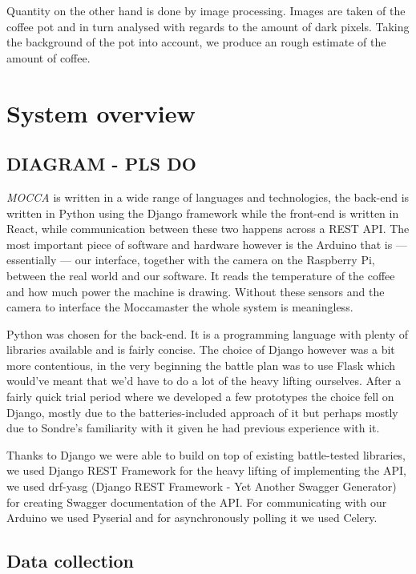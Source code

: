 \documentclass[12pt,a4paper,oneside,article]{memoir}
\numberwithin{equation}{chapter}
\begin{document}
Quantity on the other hand is done by image processing. Images are taken of the 
coffee pot and in turn analysed with regards to the amount of dark pixels. 
Taking the background of the pot into account, we produce an rough estimate of 
the amount of coffee. 


\section{System overview}\label{sec:technical-details}

\subsection{DIAGRAM - PLS DO}
\textit{MOCCA} is written in a wide range of languages and technologies, the
back-end is written in Python using the Django framework while the front-end is
written in React, while communication between these two happens across a REST
API.
The most important piece of software and hardware however is the Arduino
that is --- essentially --- our interface, together with the camera on the 
Raspberry Pi, between the real world and our software. It reads the temperature 
of the coffee and how much power the machine is drawing. Without these sensors 
and the camera to interface the Moccamaster the whole system is meaningless. 

Python was chosen for the back-end. It is a programming language with plenty of 
libraries available and is fairly concise. The choice of Django however was a 
bit more contentious, in the very beginning the battle plan was to use Flask 
which would've meant that we'd have to do a lot of the heavy lifting ourselves.
After a fairly quick trial period where we developed a few prototypes the choice
fell on Django, mostly due to the batteries-included approach of it but perhaps
mostly due to Sondre's familiarity with it given he had previous experience with
it.

Thanks to Django we were able to build on top of existing battle-tested
libraries, we used Django REST Framework for the heavy lifting of implementing
the API, we used drf-yasg (Django REST Framework - Yet Another Swagger
Generator) for creating Swagger documentation of the API. For communicating with
our Arduino we used Pyserial and for asynchronously polling it we used Celery.

\subsection{Data collection}\label{sec:data-collection}
\end{document}
